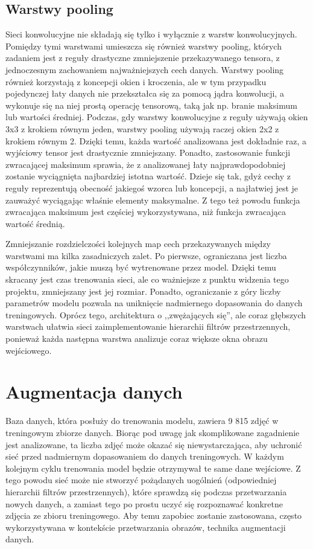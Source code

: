 \subsection{Warstwy pooling}
Sieci konwolucyjne nie składają się tylko i wyłącznie z warstw konwolucyjnych. Pomiędzy tymi warstwami umieszcza się również warstwy pooling, których zadaniem jest z reguły drastyczne zmniejszenie przekazywanego tensora, z jednoczesnym zachowaniem najważniejszych cech danych. Warstwy pooling również korzystają z koncepcji okien i kroczenia, ale w tym przypadku 
pojedynczej łaty danych nie przekształca się za pomocą jądra konwolucji, a wykonuje się na niej prostą operację tensorową, taką jak np. branie maksimum lub wartości średniej. Podczas, gdy warstwy konwolucyjne z reguły używają okien 3x3 z krokiem równym jeden, warstwy pooling używają raczej okien 2x2 z krokiem równym 2. Dzięki temu, każda wartość analizowana jest dokładnie raz, a wyjściowy tensor jest drastycznie zmniejszany. Ponadto, zastosowanie funkcji zwracającej maksimum sprawia, że z analizowanej łaty najprawdopodobniej zostanie wyciągnięta najbardziej istotna wartość. Dzieje się tak, gdyż cechy z reguły reprezentują obecność jakiegoś wzorca lub koncepcji, a najłatwiej jest je zauważyć wyciągając właśnie elementy maksymalne. Z tego też powodu funkcja zwracająca maksimum jest częściej wykorzystywana, niż funkcja zwracająca wartość średnią.

Zmniejszanie rozdzielczości kolejnych map cech przekazywanych między warstwami ma kilka zasadniczych zalet. Po pierwsze, ograniczana jest liczba współczynników, jakie muszą być wytrenowane przez model. Dzięki temu skracany jest czas trenowania sieci, ale co ważniejsze z punktu widzenia tego projektu, zmniejszany jest jej rozmiar. Ponadto, ograniczanie z góry liczby parametrów modelu pozwala na uniknięcie nadmiernego dopasowania do danych treningowych. Oprócz tego, architektura o ,,zwężających się'', ale coraz głębszych warstwach ułatwia sieci zaimplementowanie hierarchii filtrów przestrzennych, ponieważ każda następna warstwa analizuje coraz większe okna obrazu wejściowego.


\section{Augmentacja danych}
Baza danych, która posłuży do trenowania modelu, zawiera 9 815 zdjęć w treningowym zbiorze danych.
Biorąc pod uwagę jak skomplikowane zagadnienie jest analizowane, ta liczba zdjęć może okazać się niewystarczająca, aby uchronić sieć przed nadmiernym dopasowaniem do danych treningowych. 
W każdym kolejnym cyklu trenowania model będzie otrzymywał te same dane wejściowe.
Z tego powodu sieć może nie stworzyć pożądanych uogólnień (odpowiedniej hierarchii filtrów przestrzennych), które sprawdzą się podczas przetwarzania nowych danych, a zamiast tego po prostu uczyć się rozpoznawać konkretne zdjęcia ze zbioru treningowego.
Aby temu zapobiec zostanie zastosowana, często wykorzystywana w kontekście przetwarzania obrazów, technika augmentacji danych.

